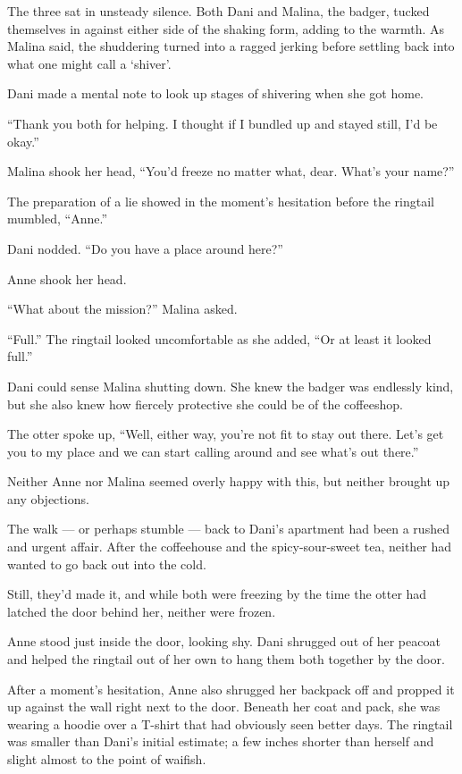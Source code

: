 The three sat in unsteady silence. Both Dani and Malina, the badger, tucked themselves in against either side of the shaking form, adding to the warmth. As Malina said, the shuddering turned into a ragged jerking before settling back into what one might call a `shiver'.

Dani made a mental note to look up stages of shivering when she got home.

``Thank you both for helping. I thought if I bundled up and stayed still, I'd be okay.''

Malina shook her head, ``You'd freeze no matter what, dear. What's your name?''

The preparation of a lie showed in the moment's hesitation before the ringtail mumbled, ``Anne.''

Dani nodded. ``Do you have a place around here?''

Anne shook her head.

``What about the mission?'' Malina asked.

``Full.'' The ringtail looked uncomfortable as she added, ``Or at least it looked full.''

Dani could sense Malina shutting down. She knew the badger was endlessly kind, but she also knew how fiercely protective she could be of the coffeeshop.

The otter spoke up, ``Well, either way, you're not fit to stay out there. Let's get you to my place and we can start calling around and see what's out there.''

Neither Anne nor Malina seemed overly happy with this, but neither brought up any objections.

\secdiv

The walk --- or perhaps stumble --- back to Dani's apartment had been a rushed and urgent affair. After the coffeehouse and the spicy-sour-sweet tea, neither had wanted to go back out into the cold.

Still, they'd made it, and while both were freezing by the time the otter had latched the door behind her, neither were frozen.

Anne stood just inside the door, looking shy. Dani shrugged out of her peacoat and helped the ringtail out of her own to hang them both together by the door.

After a moment's hesitation, Anne also shrugged her backpack off and propped it up against the wall right next to the door. Beneath her coat and pack, she was wearing a hoodie over a T-shirt that had obviously seen better days. The ringtail was smaller than Dani's initial estimate; a few inches shorter than herself and slight almost to the point of waifish.

